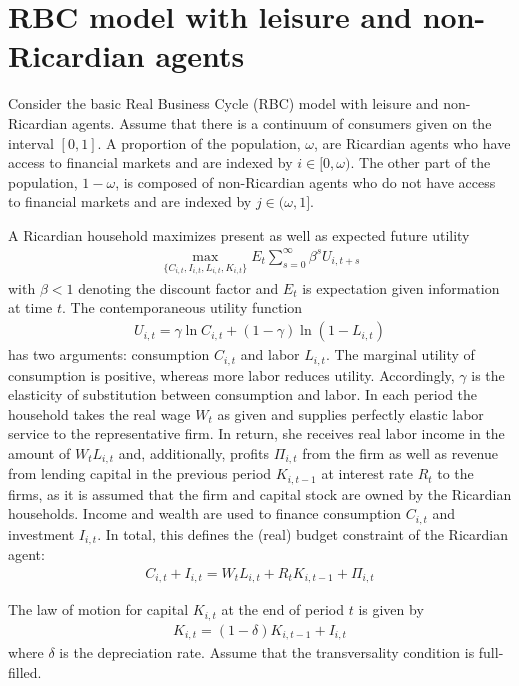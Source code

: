 \documentclass[a4paper]{scrartcl}
\begin{document}
\section{RBC model with leisure and non-Ricardian agents}
Consider the basic Real Business Cycle (RBC) model with leisure and non-Ricardian agents. Assume that there is a continuum of consumers given on the interval $[0,1]$. A proportion of the population, $\omega$, are Ricardian agents who have access to financial markets and are indexed by $i \in [0,\omega)$. The other part of the population, $1-\omega$, is composed of non-Ricardian agents who do not have access to financial markets and are indexed by $j \in (\omega,1]$.

A Ricardian household maximizes present as well as expected future utility
\begin{align*}
\underset{\{C_{i,t},I_{i,t},L_{i,t},K_{i,t}\}}{\max} E_t \sum_{s=0}^{\infty} \beta^{s} U_{i,t+s}
\end{align*}
with $\beta <1$ denoting the discount factor and $E_t$ is expectation given information at time $t$. The contemporaneous utility function 
\begin{align*}
U_{i,t} = \gamma \ln C_{i,t} + (1-\gamma) \ln{(1-L_{i,t})}
\end{align*}
has two arguments: consumption $C_{i,t}$ and labor $L_{i,t}$. The marginal utility of consumption is positive, whereas more labor reduces utility. Accordingly, $\gamma$ is the elasticity of substitution between consumption and labor. In each period the household takes the real wage $W_t$ as given and supplies perfectly elastic labor service to the representative firm. In return, she receives real labor income in the amount of $W_t L_{i,t}$ and, additionally, profits $\Pi_{i,t}$ from the firm as well as revenue from lending capital in the previous period $K_{i,t-1}$ at interest rate $R_t$ to the firms, as it is assumed that the firm and capital stock are owned by the Ricardian households. Income and wealth are used to finance consumption $C_{i,t}$ and investment $I_{i,t}$. In total, this defines the (real) budget constraint of the Ricardian agent:
\begin{align*}
C_{i,t} + I_{i,t} = W_t L_{i,t} + R_t K_{i,t-1} + \Pi_{i,t}
\end{align*}

The law of motion for capital $K_{i,t}$ at the end of period $t$ is given by
\begin{align*}
K_{i,t} = (1-\delta)K_{i,t-1} + I_{i,t}
\end{align*}
where $\delta$ is the depreciation rate. Assume that the transversality condition is full-filled.
\end{document}
